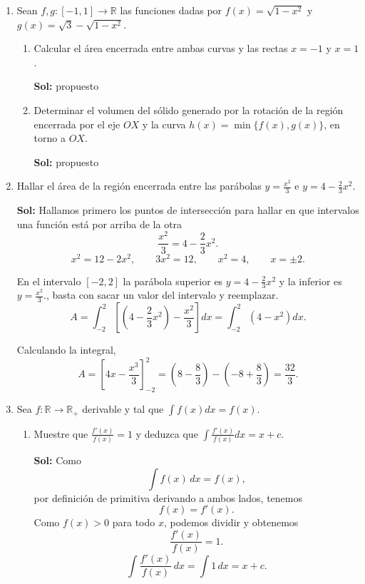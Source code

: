 \documentclass[letterpaper,12pt]{article}
\theoremstyle{plain}
\theoremstyle{definition}
\begin{document}
\begin{enumerate}
\item Sean $f, g : [-1, 1] \to \mathbb{R}$ las funciones dadas por $f(x) = \sqrt{1 - x^2}$ y $g(x) = \sqrt{3} - \sqrt{1 - x^2}$.
\begin{enumerate}
    \item Calcular el área encerrada entre ambas curvas y las rectas $x = -1$ y $x = 1$.

\color{blue}
    \textbf{Sol:} propuesto
    \color{black}
    
    \item Determinar el volumen del sólido generado por la rotación de la región encerrada por el eje $OX$ y la curva $h(x) = \min\{f(x), g(x)\}$, en torno a $OX$.

\color{blue}
    \textbf{Sol:} propuesto 
    \color{black}
    
\end{enumerate}

\item Hallar el área de la región encerrada entre las parábolas $y = \frac{x^2}{3}$ e $y = 4 - \frac{2}{3}x^2$.

\color{blue}
    \textbf{Sol:} Hallamos primero los puntos de intersección para hallar en que intervalos una función está por arriba de la otra
\[
\frac{x^2}{3}=4-\frac{2}{3}x^2.
\]
\[
x^2=12-2x^2,
\qquad
3x^2=12,
\qquad
x^2=4,
\qquad
x=\pm2.
\]

En el intervalo $[-2,2]$ la parábola superior es
\(
y=4-\frac{2}{3}x^2
\)
y la inferior es
\(
y=\frac{x^2}{3}.
\), basta con sacar un valor del intervalo y reemplazar.
\[
A=\int_{-2}^{2}
\left[\left(4-\frac{2}{3}x^2\right)-\frac{x^2}{3}\right]dx
=\int_{-2}^{2}\left(4-x^2\right)dx.
\]

Calculando la integral,
\[
A=\left[4x-\frac{x^3}{3}\right]_{-2}^{2}
=\left(8-\frac{8}{3}\right)-\left(-8+\frac{8}{3}\right)
=\frac{32}{3}.
\]
    \color{black}


\item Sea $f : \mathbb{R} \to \mathbb{R}_{+}$ derivable y tal que $\displaystyle \int f(x)dx = f(x)$.
\begin{enumerate}
    \item Muestre que $\frac{f'(x)}{f(x)} = 1$ y deduzca que $\displaystyle \int \frac{f'(x)}{f(x)}dx = x + c$.

    \color{blue}
    \textbf{Sol:} Como
\[
\int f(x)\,dx=f(x),
\]
por definición de primitiva derivando a ambos lados, tenemos
\[
f(x)=f'(x).
\]
Como $f(x)>0$ para todo $x$, podemos dividir y obtenemos
\[
\frac{f'(x)}{f(x)}=1.
\]
\[
\int \frac{f'(x)}{f(x)}\,dx=\int 1\,dx=x+c.
\]


\end{enumerate}
\end{enumerate}
\end{document}
